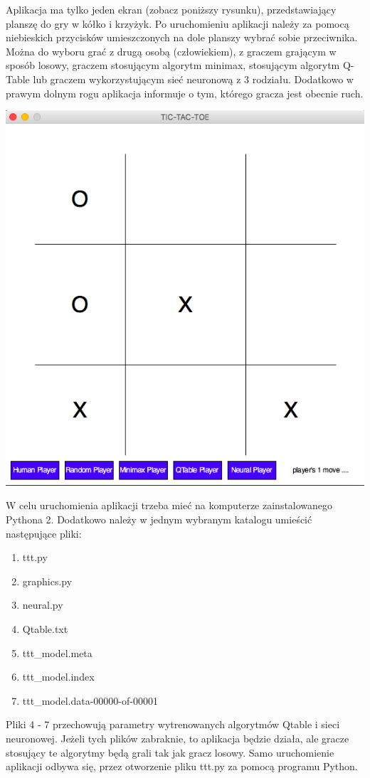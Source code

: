 \documentclass[licencjacka]{pracamgr}
\begin{document}
Aplikacja ma tylko jeden ekran (zobacz poniższy rysunku), przedstawiający planszę do gry w kółko i krzyżyk. Po uruchomieniu aplikacji 
należy za pomocą niebieskich przycisków umieszczonych na dole planszy wybrać sobie przeciwnika. Można do wyboru grać z drugą osobą (człowiekiem), 
z graczem grającym w sposób losowy,  graczem stosującym algorytm minimax, stosującym algorytm Q-Table lub graczem wykorzystującym sieć neuronową 
z 3 rodziału. Dodatkowo w prawym dolnym rogu aplikacja informuje o tym, którego gracza jest obecnie ruch.

\begin{flushleft}
	\includegraphics [scale=0.5] {plansza.png}
\end{flushleft} 



W celu uruchomienia aplikacji trzeba mieć na komputerze zainstalowanego Pythona 2. Dodatkowo należy w jednym wybranym katalogu umieścić następujące 
pliki:
\begin{enumerate}
	\item{ttt.py}
	\item{graphics.py}
	\item{neural.py}
	\item{Qtable.txt}
	\item{ttt\_model.meta}
	\item{ttt\_model.index}
	\item{ttt\_model.data-00000-of-00001}
\end{enumerate}
Pliki 4 - 7 przechowują parametry wytrenowanych algorytmów Qtable i sieci neuronowej. Jeżeli tych plików zabraknie, to aplikacja będzie działa, ale 
gracze stosujący te algorytmy będą grali tak jak gracz losowy. Samo uruchomienie aplikacji odbywa się, przez otworzenie pliku ttt.py za pomocą programu Python. 
\end{document}
